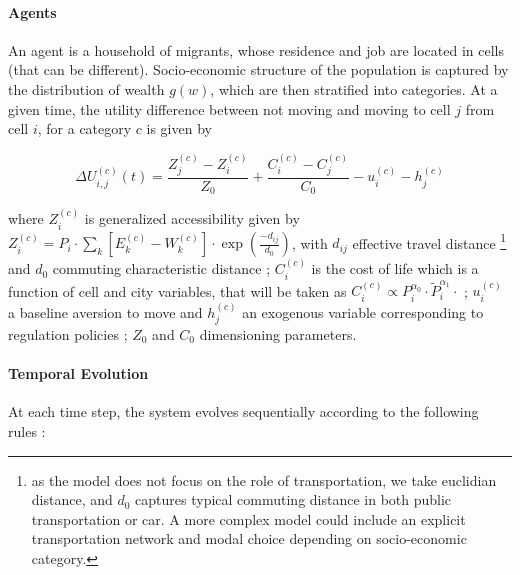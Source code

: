 \paragraph{Agents}

An agent is a household of migrants, whose residence and job are located in cells (that can be different). Socio-economic structure of the population is captured by the distribution of wealth $g(w)$, which are then stratified into categories. At a given time, the utility difference between not moving and moving to cell $j$ from cell $i$, for a category $c$ is given by

\[
\Delta U_{i,j}^{(c)}(t) = \frac{Z_j^{(c)}- Z_i^{(c)}}{Z_0} + \frac{C_i^{(c)}- C_j^{(c)}}{C_0} - u_i^{(c)} - h_j^{(c)}
\]

where $Z_i^{(c)}$ is generalized accessibility given by $Z_i^{(c)} = P_i \cdot \sum_k \left[E_k^{(c)}-W_k^{(c)}\right]\cdot \exp{\left(\frac{-d_{ij}}{d_0}\right)}$, with $d_{ij}$ effective travel distance \footnote{as the model does not focus on the role of transportation, we take euclidian distance, and $d_0$ captures typical commuting distance in both public transportation or car. A more complex model could include an explicit transportation network and modal choice depending on socio-economic category.} and $d_0$ commuting characteristic distance ; $C_i^{(c)}$ is the cost of life which is a function of cell and city variables, that will be taken as $C_i^{(c)} \propto P_i^{\alpha_0}\cdot  \tilde{P}_i^{\alpha_1}\cdot$ ; $u_i^{(c)}$ a baseline aversion to move and $h_j^{(c)}$ an exogenous variable corresponding to regulation policies ; $Z_0$ and $C_0$ dimensioning parameters.

\paragraph{Temporal Evolution}

At each time step, the system evolves sequentially according to the following rules :

